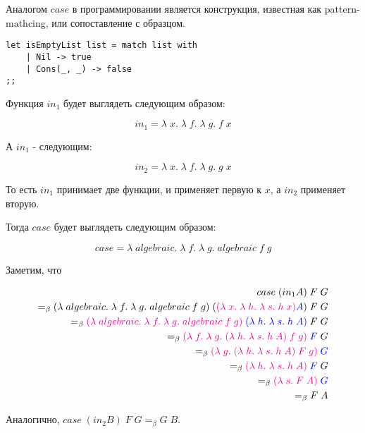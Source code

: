 Аналогом $case$ в программировании является конструкция, известная как pattern-mathcing, или сопоставление с образцом.

\begin{verbatim}
let isEmptyList list = match list with
	| Nil -> true
	| Cons(_, _) -> false
;;
\end{verbatim}

Функция $in_1$ будет выглядеть следующим образом: 

$$in_1 = \lambda \; x. \; \lambda \; f. \; \lambda \; g. \; f \; x$$

А $in_1$ -  следующим:

$$in_2 = \lambda \; x. \; \lambda \; f. \; \lambda \; g. \; g \; x$$

То есть $in_1$ принимает две функции, и применяет первую к $x$, а $in_2$ применяет вторую.

Тогда $case$ будет выглядеть следующим образом:

$$case = \lambda \; algebraic. \; \lambda \; f. \; \lambda \; g. \; algebraic \; f \; g$$

Заметим, что 

\begin{align*}
case \; (in_1 A) \; F \; G \\ =_\beta (\lambda \; algebraic. \; \lambda \; f. \; \lambda \; g. \; algebraic \; f \; g) \; (\textcolor{magenta}{(\lambda \; x. \; \lambda \; h. \; \lambda \; s. \; h \; x)} \textcolor{blue}{A}) \; F \; G \\ =_\beta  \textcolor{magenta}{(\lambda \; algebraic. \; \lambda \; f. \; \lambda \; g. \; algebraic \; f \; g)} \; \textcolor{blue}{(\lambda \; h. \; \lambda \; s. \; h \; A)} \; F \; G \\ =_\beta \textcolor{magenta}{(\lambda \; f. \; \lambda \; g. \; (\lambda \; h. \; \lambda \; s. \; h \; A) \; f \; g)} \; \textcolor{blue}{F} \; G \\ =_\beta \textcolor{magenta}{(\lambda \; g. \; (\lambda \; h. \; \lambda \; s. \; h \; A) \; F \; g)} \; \textcolor{blue}{G}  \\ =_\beta \textcolor{magenta}{(\lambda \; h. \; \lambda \; s. \; h \; A)} \; \textcolor{blue}{F} \; G \\ =_\beta \textcolor{magenta}{(\lambda \; s. \; F \; A)} \; \textcolor{blue}{G} \\ =_\beta F \; A
\end{align*}

Аналогично, $case \; (in_2 B) \; F \; G =_\beta G \; B$. 

